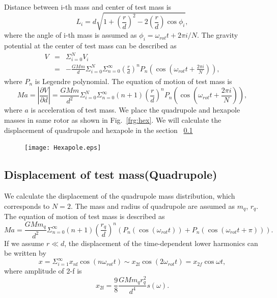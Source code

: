 \documentclass[12pt]{iopart}
\begin{document}
Distance between i-th mass and center of test mass is 
\begin{equation}
L_i=d \sqrt{1+\left( \frac{r}{d} \right)^2 -2\left( \frac{r}{d} \right) \cos{\phi_i} },
\end{equation}
where the angle of i-th mass is assumed as $\phi_i=\omega_{rot} t + 2\pi i/N$.
The gravity potential at the center of test mass can be described as
\begin{eqnarray}
V &=& \Sigma^N_{i=0} V_i \\
&=&-\frac{GMm}{d} \Sigma^N_{i=0} \Sigma^{\infty}_{n=0} \left( \frac{r}{d} \right)^n P_n\left(\cos{\left(\omega_{rot} t +\frac{2 \pi i}{N}\right)}\right),
\end{eqnarray}
where $P_n$ is Legendre polynomial. The equation of motion of test mass is 
\begin{equation}
Ma=\left| \frac{\partial V}{\partial{d}} \right| =\frac{GMm}{d^2}\Sigma^N_{i=0} \Sigma^{\infty}_{n=0}(n+1) \left( \frac{r}{d} \right)^n P_n\left(\cos{\left(\omega_{rot} t +\frac{2 \pi i}{N}\right)}\right),
\end{equation}
where $a$ is acceleration of test mass. We place the quadrupole and hexapole masses in same rotor as shown in Fig.~\ref{frg:hex}. We will calculate the displacement of quadrupole and hexapole in the section ~\ref{Quad} 

\begin{figure}
\begin{center}
\texttt{[image: Hexapole.eps]}
\caption{}
\label{fig:hex}
\end{center}
\end{figure}

\subsection{Displacement of test mass(Quadrupole)} \label{Quad}
We calculate the displacement of the quadrupole mass distribution, which corresponds to $N=2$.
The mass and radius of quadrupole are assumed as $m_q$, $r_q$. 
The equation of motion of test mass is described as
\begin{equation}
Ma=\frac{GMm_q}{d^2}\Sigma^{\infty}_{n=0}(n+1) \left( \frac{r_q}{d} \right)^n \left( P_n\left(\cos{\left(\omega_{rot} t \right)}\right) + P_n\left(\cos{\left(\omega_{rot} t +\pi \right)}\right) \right).
\end{equation} 
If we assume $r \ll d$, the displacement of the time-dependent lower harmonics can be written by 
\begin{equation}
x=\Sigma_{i=1}^{\infty}x_{n\mathrm{f}}\cos(n\omega_{rot} t)\sim x_{2\mathrm{f}}\cos(2\omega_{rot} t)=x_{2f}\cos{\omega t},
\end{equation}
where amplitude of 2-f is
\begin{equation}
x_{2\mathrm{f}}=\frac{9}{8}\frac{GMm_{q}r_{q}^2}{d^4}s(\omega). \label{2f}
\end{equation}
\end{document}
